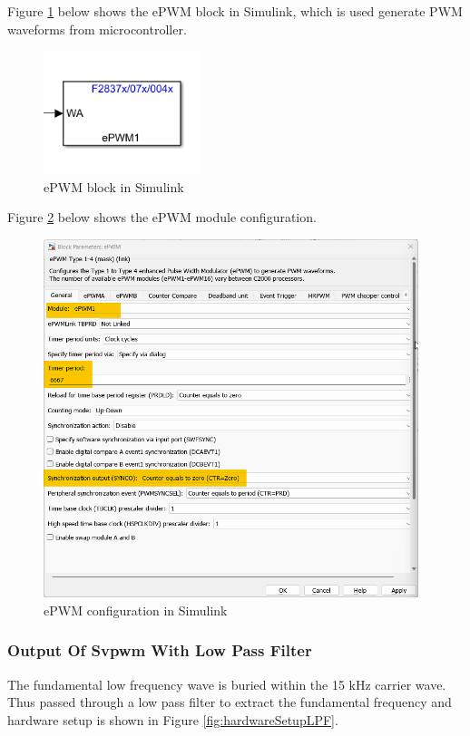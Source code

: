 Figure \ref{fig:svpwm_block} below shows the ePWM block in Simulink, which is used generate PWM waveforms from microcontroller.

\begin{figure}[H]
	\centering
	\includegraphics[width=1.8in]{sections/section6/images/SVPWM/ePWMBlock.png}
	\caption{ePWM block in Simulink}
	\label{fig:svpwm_block}
\end{figure}

Figure \ref{fig:ePWMTBPRD} below shows the ePWM module configuration.

\begin{figure}[H]
	\centering
	\includegraphics[width=4.3in]{sections/section6/images/SVPWM/ePWMTBPRD.png}
	\caption{ePWM configuration in Simulink}
	\label{fig:ePWMTBPRD}
\end{figure}

\subsubsection{Output Of Svpwm With Low Pass Filter}


The fundamental low frequency wave is buried within the 15 kHz carrier wave. Thus passed through a low pass filter to extract the fundamental frequency and hardware setup is shown in Figure \ref{fig:hardwareSetupLPF}.

